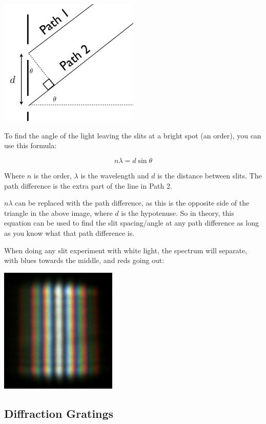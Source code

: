 \documentclass[a4paper, 12pt]{article}
\begin{document}
\begin{center}
\includegraphics[width=0.5\textwidth]{images/pathDifference.jpg}
\end{center}

To find the angle of the light leaving the slits at a bright spot (an order), you can use this formula:

$$
n\lambda = d\sin\theta
$$

Where $n$ is the order, $\lambda$ is the wavelength and $d$ is the distance between slits. The path difference is the extra part of the line in Path 2.

$n{\lambda}$ can be replaced with the path difference, as this is the opposite side of the triangle in the above image, where $d$ is the hypotenuse. So in theory, this equation can be used to find the slit spacing/angle at any path difference as long as you know what that path difference is.

When doing any slit experiment with white light, the spectrum will separate, with blues towards the middle, and reds going out:

\begin{center}
\includegraphics[height=6cm]{images/doubleSlitWhite.png}
\end{center}

\subsection{Diffraction Gratings}
\end{document}
